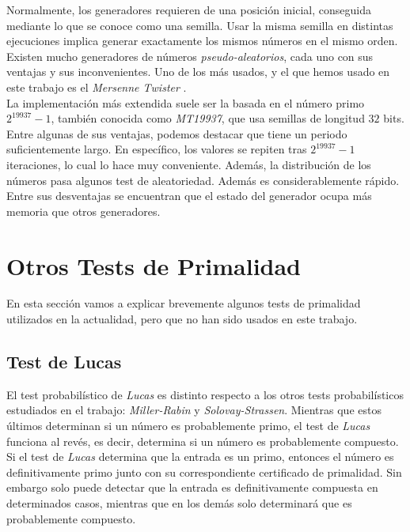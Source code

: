 Normalmente, los generadores requieren de una posición inicial, conseguida mediante lo que se conoce como una semilla. Usar la misma semilla en distintas ejecuciones implica generar exactamente los mismos números en el mismo orden.\\

Existen mucho generadores de números \textit{pseudo-aleatorios}, cada uno con sus ventajas y sus inconvenientes. Uno de los más usados, y el que hemos usado en este trabajo es el \textit{Mersenne Twister} \cite{matsumoto_nishimura_1998}.\\

La implementación más extendida suele ser la basada en el número primo $2^{19937}-1$, también conocida como \textit{MT19937}, que usa semillas de longitud $32$ bits. Entre algunas de sus ventajas, podemos destacar que tiene un periodo suficientemente largo. En específico, los valores se repiten tras $2^{19937}-1$ iteraciones, lo cual lo hace muy conveniente. Además, la distribución de los números pasa algunos test de aleatoriedad. Además es considerablemente rápido.\\

Entre sus desventajas se encuentran que el estado del generador ocupa más memoria que otros generadores.

\section{Otros Tests de Primalidad}

En esta sección vamos a explicar brevemente algunos tests de primalidad utilizados en la actualidad, pero que no han sido usados en este trabajo.

\subsection{Test de Lucas}

El test probabilístico de \textit{Lucas} es distinto respecto a los otros tests probabilísticos estudiados en el trabajo: \textit{Miller-Rabin} y \textit{Solovay-Strassen}. Mientras que estos últimos determinan si un número es probablemente primo, el test de \textit{Lucas} funciona al revés, es decir, determina si un número es probablemente compuesto.\\

Si el test de \textit{Lucas} determina que la entrada es un primo, entonces el número es definitivamente primo junto con su correspondiente certificado de primalidad. Sin embargo solo puede detectar que la entrada es definitivamente compuesta en determinados casos, mientras que en los demás solo determinará que es probablemente compuesto.\\

